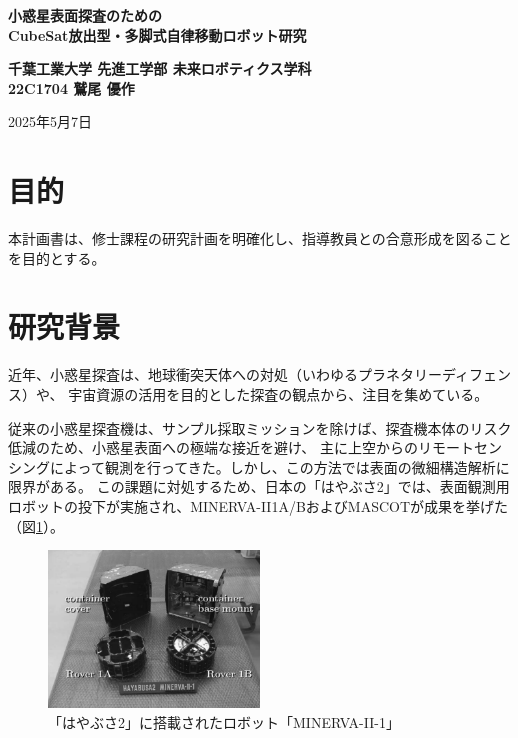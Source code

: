 \documentclass[dvipdfmx,titlepage,a4j]{jsarticle}
\author{waarrk}
\date{2023年2月1日}
\begin{document}
\begin{titlepage}
    \centering
    \vspace*{2cm}

    \vspace{5cm}

    {\LARGE \textbf{小惑星表面探査のための\\CubeSat放出型・多脚式自律移動ロボット研究}}

    \vspace{0.5cm}

    {\textbf{千葉工業大学 先進工学部 未来ロボティクス学科}\\}
    {\textbf{22C1704 鷲尾 優作}}

    \vfill

    {\large 2025年5月7日}

    \vspace{1cm}
\end{titlepage}

\newpage

\section{目的}
本計画書は、修士課程の研究計画を明確化し、指導教員との合意形成を図ることを目的とする。

\section{研究背景}
近年、小惑星探査は、地球衝突天体への対処（いわゆるプラネタリーディフェンス）や、
宇宙資源の活用を目的とした探査の観点から、注目を集めている。

従来の小惑星探査機は、サンプル採取ミッションを除けば、探査機本体のリスク低減のため、小惑星表面への極端な接近を避け、
主に上空からのリモートセンシングによって観測を行ってきた。しかし、この方法では表面の微細構造解析に限界がある。
この課題に対処するため、日本の「はやぶさ2」では、表面観測用ロボットの投下が実施され、MINERVA-II1A/B\cite{minelva:online}およびMASCOT\cite{Krause2022}が成果を挙げた（図\ref{fig:hayabusa2}）。


\begin{figure}[H]
    \centering
    \includegraphics[width=0.5\textwidth]{picture/mine.png}
    \caption{「はやぶさ2」に搭載されたロボット「MINERVA-II-1」}
    \label{fig:hayabusa2}
\end{figure}
\end{document}
